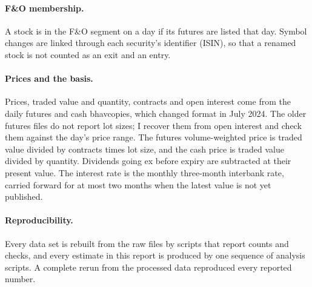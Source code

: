 \paragraph{F\&O membership.} A stock is in the F\&O segment on a day if its futures are listed that day. Symbol changes are
linked through each security's identifier (ISIN), so that a renamed stock is not counted as an exit and an entry.

\paragraph{Prices and the basis.} Prices, traded value and quantity, contracts and open interest come from the daily
futures and cash bhavcopies, which changed format in July 2024. The older futures files do not report lot sizes; I
recover them from open interest and check them against the day's price range. The futures volume-weighted price is
traded value divided by contracts times lot size, and the cash price is traded value divided by quantity. Dividends going
ex before expiry are subtracted at their present value. The interest rate is the monthly three-month interbank rate,
carried forward for at most two months when the latest value is not yet published.

\paragraph{Reproducibility.} Every data set is rebuilt from the raw files by scripts that report counts and checks, and
every estimate in this report is produced by one sequence of analysis scripts. A complete rerun from the processed data
reproduced every reported number.
